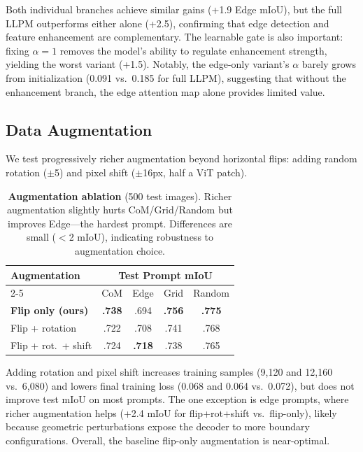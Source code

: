 Both individual branches achieve similar gains (+1.9 Edge mIoU), but the full LLPM outperforms either alone (+2.5), confirming that edge detection and feature enhancement are complementary. The learnable gate is also important: fixing $\alpha\!=\!1$ removes the model's ability to regulate enhancement strength, yielding the worst variant (+1.5). Notably, the edge-only variant's $\alpha$ barely grows from initialization (0.091 vs.\ 0.185 for full LLPM), suggesting that without the enhancement branch, the edge attention map alone provides limited value.

\subsection{Data Augmentation}

We test progressively richer augmentation beyond horizontal flips: adding random rotation ($\pm$5\textdegree) and pixel shift ($\pm$16px, half a ViT patch).

\begin{table}[t]
\centering
\caption{\textbf{Augmentation ablation} (500 test images). Richer augmentation slightly hurts CoM/Grid/Random but improves Edge---the hardest prompt. Differences are small ($<$2 mIoU), indicating robustness to augmentation choice.}
\label{tab:ablation_aug}
\small
\begin{tabular}{lcccc}
\toprule
\multirow{2}{*}{Augmentation} & \multicolumn{4}{c}{Test Prompt mIoU} \\
\cmidrule(lr){2-5}
 & CoM & Edge & Grid & Random \\
\midrule
\textbf{Flip only (ours)} & \textbf{.738} & .694 & \textbf{.756} & \textbf{.775} \\
Flip + rotation & .722 & .708 & .741 & .768 \\
Flip + rot.\ + shift & .724 & \textbf{.718} & .738 & .765 \\
\bottomrule
\end{tabular}
\end{table}

Adding rotation and pixel shift increases training samples (9,120 and 12,160 vs.\ 6,080) and lowers final training loss (0.068 and 0.064 vs.\ 0.072), but does not improve test mIoU on most prompts. The one exception is edge prompts, where richer augmentation helps (+2.4 mIoU for flip+rot+shift vs.\ flip-only), likely because geometric perturbations expose the decoder to more boundary configurations. Overall, the baseline flip-only augmentation is near-optimal.

